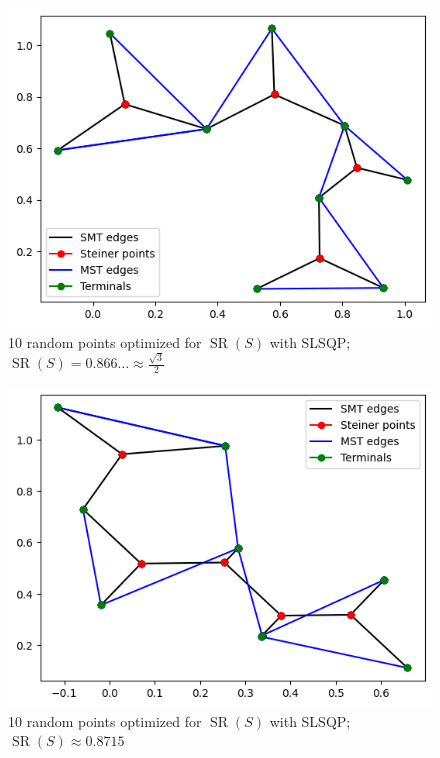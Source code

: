 \documentclass{mpaper}
\begin{document}
\begin{figure}[h!]
  \begin{center}
  \includegraphics[scale=0.5]{plot7.png}
  \end{center}
  \caption{\label{fig:7}10 random points optimized for $\operatorname{SR}(S)$ with SLSQP; $\operatorname{SR}(S)=0.866\dots\approx\frac{\sqrt{3}}{2}$}
\end{figure}

\begin{figure}[h!]
  \begin{center}
  \includegraphics[scale=0.5]{plot8715.png}
  \end{center}
  \caption{\label{fig:8}10 random points optimized for $\operatorname{SR}(S)$ with SLSQP; $\operatorname{SR}(S)\approx 0.8715$}
\end{figure}
\end{document}
